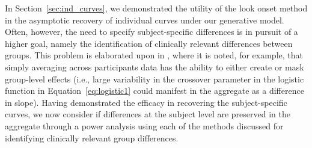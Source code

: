\documentclass{article}
\begin{document}
In Section~\ref{sec:ind_curves}, we demonstrated the utility of the look onset method in the asymptotic recovery of individual curves under our generative model. Often, however, the need to specify subject-specific differences is in pursuit of a higher goal, namely the identification of clinically relevant differences between groups. This problem is elaborated upon in \citet{mcmurray2010individual}, where it is noted, for example, that simply averaging across participants data has the ability to either create or mask group-level effects (i.e., large variability in the crossover parameter in the logistic function in Equation~\ref{eq:logistic1} could manifest in the aggregate as a difference in slope). Having demonstrated the efficacy in recovering the subject-specific curves, we now consider if differences at the subject level are preserved in the aggregate through a power analysis using each of the methods discussed for identifying clinically relevant group differences. 
\end{document}
